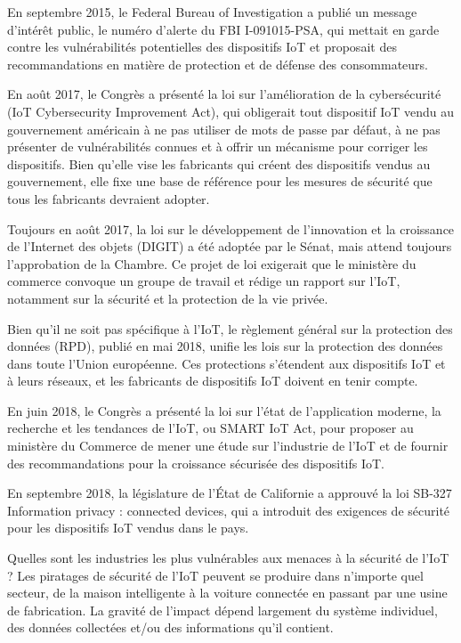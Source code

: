 En septembre 2015, le Federal Bureau of Investigation a publié un message d’intérêt public, le numéro d’alerte du FBI I-091015-PSA, qui mettait en garde contre les vulnérabilités potentielles des dispositifs IoT et proposait des recommandations en matière de protection et de défense des consommateurs.

En août 2017, le Congrès a présenté la loi sur l’amélioration de la cybersécurité (IoT Cybersecurity Improvement Act), qui obligerait tout dispositif IoT vendu au gouvernement américain à ne pas utiliser de mots de passe par défaut, à ne pas présenter de vulnérabilités connues et à offrir un mécanisme pour corriger les dispositifs. Bien qu’elle vise les fabricants qui créent des dispositifs vendus au gouvernement, elle fixe une base de référence pour les mesures de sécurité que tous les fabricants devraient adopter.

Toujours en août 2017, la loi sur le développement de l’innovation et la croissance de l’Internet des objets (DIGIT) a été adoptée par le Sénat, mais attend toujours l’approbation de la Chambre. Ce projet de loi exigerait que le ministère du commerce convoque un groupe de travail et rédige un rapport sur l’IoT, notamment sur la sécurité et la protection de la vie privée.

Bien qu’il ne soit pas spécifique à l’IoT, le règlement général sur la protection des données (RPD), publié en mai 2018, unifie les lois sur la protection des données dans toute l’Union européenne. Ces protections s’étendent aux dispositifs IoT et à leurs réseaux, et les fabricants de dispositifs IoT doivent en tenir compte.

En juin 2018, le Congrès a présenté la loi sur l’état de l’application moderne, la recherche et les tendances de l’IoT, ou SMART IoT Act, pour proposer au ministère du Commerce de mener une étude sur l’industrie de l’IoT et de fournir des recommandations pour la croissance sécurisée des dispositifs IoT.

En septembre 2018, la législature de l’État de Californie a approuvé la loi SB-327 Information privacy : connected devices, qui a introduit des exigences de sécurité pour les dispositifs IoT vendus dans le pays.

Quelles sont les industries les plus vulnérables aux menaces à la sécurité de l’IoT ?
Les piratages de sécurité de l’IoT peuvent se produire dans n’importe quel secteur, de la maison intelligente à la voiture connectée en passant par une usine de fabrication. La gravité de l’impact dépend largement du système individuel, des données collectées et/ou des informations qu’il contient.

